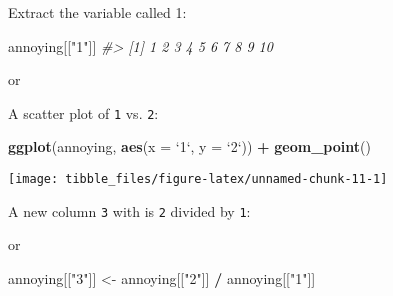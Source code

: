\documentclass[]{book}
\newenvironment{Shaded}{\begin{snugshade}}{\end{snugshade}}
\newcommand{\CommentTok}[1]{\textcolor[rgb]{0.56,0.35,0.01}{\textit{#1}}}
\newcommand{\DataTypeTok}[1]{\textcolor[rgb]{0.13,0.29,0.53}{#1}}
\newcommand{\KeywordTok}[1]{\textcolor[rgb]{0.13,0.29,0.53}{\textbf{#1}}}
\newcommand{\NormalTok}[1]{#1}
\newcommand{\OperatorTok}[1]{\textcolor[rgb]{0.81,0.36,0.00}{\textbf{#1}}}
\newcommand{\StringTok}[1]{\textcolor[rgb]{0.31,0.60,0.02}{#1}}
\theoremstyle{plain}
\theoremstyle{remark}
\theoremstyle{definition}
\theoremstyle{definition}
\theoremstyle{definition}
\theoremstyle{remark}
\begin{document}
Extract the variable called 1:

\begin{Shaded}
\begin{Highlighting}[]
\NormalTok{annoying[[}\StringTok{"1"}\NormalTok{]]}
\CommentTok{#>  [1]  1  2  3  4  5  6  7  8  9 10}
\end{Highlighting}
\end{Shaded}

or

\begin{Shaded}
\end{Shaded}

A scatter plot of \texttt{1} vs. \texttt{2}:

\begin{Shaded}
\begin{Highlighting}[]
\KeywordTok{ggplot}\NormalTok{(annoying, }\KeywordTok{aes}\NormalTok{(}\DataTypeTok{x =} \StringTok{`}\DataTypeTok{1}\StringTok{`}\NormalTok{, }\DataTypeTok{y =} \StringTok{`}\DataTypeTok{2}\StringTok{`}\NormalTok{)) }\OperatorTok{+}
\StringTok{  }\KeywordTok{geom_point}\NormalTok{()}
\end{Highlighting}
\end{Shaded}

\begin{center}\texttt{[image: tibble\_files/figure-latex/unnamed-chunk-11-1]} \end{center}

A new column \texttt{3} with is \texttt{2} divided by \texttt{1}:

\begin{Shaded}
\end{Shaded}

or

\begin{Shaded}
\begin{Highlighting}[]
\NormalTok{annoying[[}\StringTok{"3"}\NormalTok{]] <-}\StringTok{ }\NormalTok{annoying[[}\StringTok{"2"}\NormalTok{]] }\OperatorTok{/}\StringTok{ }\NormalTok{annoying[[}\StringTok{"1"}\NormalTok{]]}
\end{Highlighting}
\end{Shaded}
\end{document}
